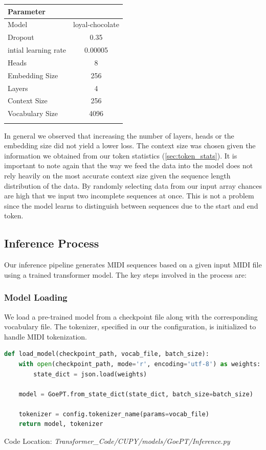 \documentclass[a4paper,12pt]{extarticle}
\begin{document}
\begin{center}
    \begin{tabular}{lc}
  \toprule
  \textbf{Parameter} &  \\
  \midrule
  Model & loyal-chocolate \\
  Dropout & 0.35 \\
  intial learning rate & 0.00005 \\
  Heads  & 8 \\
  Embedding Size  & 256 \\
  Layers  & 4 \\
  Context Size & 256 \\
  Vocabulary Size & 4096 \\
  \bottomrule
  \label{tab:parameters}
\end{tabular}
\end{center}
In general we observed that increasing the number of layers, heads or the embedding size did not yield a lower loss.
The context size was chosen given the information we obtained from our token statistics (\ref{sec:token_stats}).
It is important to note again that the way we feed the data into the model does not rely heavily on the most accurate context size given the sequence length distribution of the data.
By randomly selecting data from our input array chances are high that we input two incomplete sequences at once. This is not a problem since the model learns to distinguish between sequences due to the start and end token.


\subsection{Inference Process}

Our inference pipeline generates MIDI sequences based on a given input MIDI file using a trained transformer model. The key steps involved in the process are:

\subsubsection{Model Loading}
We load a pre-trained model from a checkpoint file along with the corresponding vocabulary file. The tokenizer, specified in our the configuration, is initialized to handle MIDI tokenization.
\begin{lstlisting}[language=Python, caption=Loading the pre-trained model and tokenizer]
def load_model(checkpoint_path, vocab_file, batch_size):
    with open(checkpoint_path, mode='r', encoding='utf-8') as weights:
        state_dict = json.load(weights)

    model = GoePT.from_state_dict(state_dict, batch_size=batch_size)
    
    tokenizer = config.tokenizer_name(params=vocab_file)
    return model, tokenizer
\end{lstlisting}
Code Location: \textit{Transformer\_Code/CUPY/models/GoePT/Inference.py}
\end{document}
